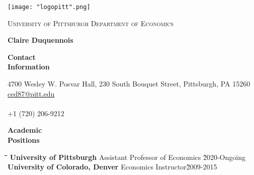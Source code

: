 \documentclass[10pt, oneside]{article}
\newcommand\mytabs{\hspace*{1cm}\=\hspace{1cm}\=\hspace{1cm}\=\hspace{1cm}\=\hspace{1cm}\=\hspace{1cm}\=\hspace{1cm}\=\hspace{1cm}\=\hspace{1cm}\=\hspace{1cm}}
\newenvironment{mysec}[1][\mytabs]
  {\begin{tabbing}#1\kill\ignorespaces}
  {\end{tabbing}}
\begin{document}

\texttt{[image: "logopitt".png]} 

\textsc{University of Pittsburgh} \hfill \textsc{Department of Economics}\\
\begin{center}
{\large \bfseries Claire Duquennois} \\
\end{center} 

\begin{minipage}[t]{0.1\linewidth}
\textbf{Contact \\ Information}
\end{minipage}\hspace{0.05\linewidth}
\begin{minipage}[t]{0.8\linewidth}
4700 Wesley W. Posvar Hall, 230 South Bouquet Street, Pittsburgh, PA  15260\\
\href{mailto: ced87@pitt.edu}{ced87@pitt.edu} \\
\href{https://sites.google.com/view/claireduquennois/}{\color{blue}{https://sites.google.com/view/claireduquennois/} }\\
+1 (720) 206-9212
\end{minipage}\vspace{3mm}

\begin{minipage}[t]{0.1\linewidth}
\textbf{Academic\\ Positions}
\end{minipage}\hspace{0.05\linewidth}
\begin{minipage}[t]{0.8\linewidth}
\begin{mysec} 
\textbf{University of Pittsburgh} \>\>\>\>\>\>Assistant Professor of Economics \`2020-Ongoing\\
\textbf{University of Colorado, Denver} \>\>\>\>\>\>Economics Instructor\`2009-2015\\
\end{mysec}
\end{minipage}\vspace{3mm}
\end{document}
